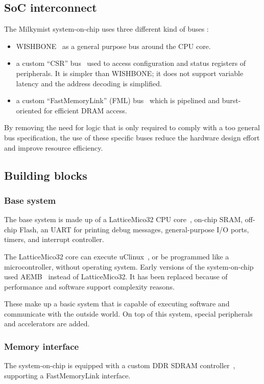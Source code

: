 \documentclass[a4paper,11pt,twocolumn]{paper}
\begin{document}
\subsection{SoC interconnect}
The Milkymist system-on-chip uses three different kind of buses :
\begin{itemize}
\item WISHBONE~\cite{wishbone} as a general purpose bus around the CPU core.
\item a custom ``CSR'' bus~\cite{csr} used to access configuration and status registers of peripherals. It is simpler than WISHBONE; it does not support variable latency and the address decoding is simplified.
\item a custom ``FastMemoryLink'' (FML) bus~\cite{fml} which is pipelined and burst-oriented for efficient DRAM access.
\end{itemize}
By removing the need for logic that is only required to comply with a too general bus specification, the use of these specific buses reduce the hardware design effort and improve resource efficiency.

\subsection{Building blocks}
\subsubsection{Base system}
The base system is made up of a LatticeMico32 CPU core~\cite{mico32}, on-chip SRAM, off-chip Flash, an UART for printing debug messages, general-purpose I/O ports, timers, and interrupt controller.

The LatticeMico32 core can execute uClinux~\cite{micolinux}, or be programmed like a microcontroller, without operating system. Early versions of the system-on-chip used AEMB~\cite{aemb} instead of LatticeMico32. It has been replaced because of performance and software support complexity reasons.

These make up a basic system that is capable of executing software and communicate with the outside world. On top of this system, special peripherals and accelerators are added.

\subsubsection{Memory interface}
The system-on-chip is equipped with a custom DDR SDRAM controller~\cite{hpdmc}, supporting a FastMemoryLink interface.
\end{document}
